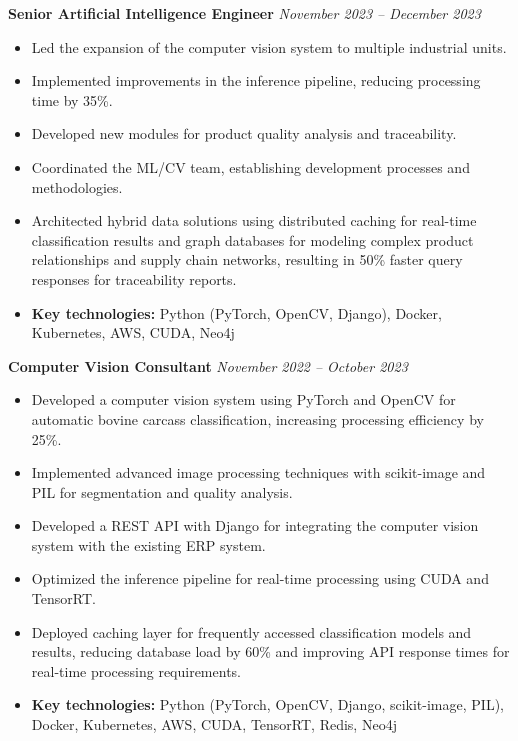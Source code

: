\documentclass[12pt,a4paper,sans]{moderncv}        %
\begin{document}
\vspace{12pt}
\textbf{Senior Artificial Intelligence Engineer} \hfill \textit{November 2023 -- December 2023}
\begin{itemize}
    \item Led the expansion of the computer vision system to multiple industrial units.
    \item Implemented improvements in the inference pipeline, reducing processing time by 35\%.
    \item Developed new modules for product quality analysis and traceability.
    \item Coordinated the ML/CV team, establishing development processes and methodologies.
    \item Architected hybrid data solutions using distributed caching for real-time classification results and graph databases for modeling complex product relationships and supply chain networks, resulting in 50\% faster query responses for traceability reports.
    \item \textbf{Key technologies:} Python (PyTorch, OpenCV, Django), Docker, Kubernetes, AWS, CUDA, Neo4j
\end{itemize}

\vspace{12pt}
\textbf{Computer Vision Consultant} \hfill \textit{November 2022 -- October 2023}
\begin{itemize}
    \item Developed a computer vision system using PyTorch and OpenCV for automatic bovine carcass classification, increasing processing efficiency by 25\%.
    \item Implemented advanced image processing techniques with scikit-image and PIL for segmentation and quality analysis.
    \item Developed a REST API with Django for integrating the computer vision system with the existing ERP system.
    \item Optimized the inference pipeline for real-time processing using CUDA and TensorRT.
    \item Deployed caching layer for frequently accessed classification models and results, reducing database load by 60\% and improving API response times for real-time processing requirements.
    \item \textbf{Key technologies:} Python (PyTorch, OpenCV, Django, scikit-image, PIL), Docker, Kubernetes, AWS, CUDA, TensorRT, Redis, Neo4j
\end{itemize}
\end{document}
